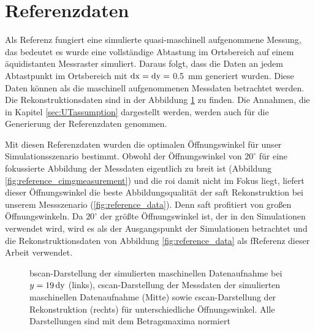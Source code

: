 \section{Referenzdaten} \label{sec:referece_data}
Als Referenz fungiert eine simulierte quasi-maschinell aufgenommene Messung, das bedeutet es wurde eine vollständige Abtastung im Ortsbereich auf einem äquidistanten Messraster simuliert. Daraus folgt, dass die Daten an jedem Abtastpunkt im Ortsbereich mit $\operatorname{dx} = \operatorname{dy} = $ \SI{0.5}{\milli \metre} generiert wurden. Diese Daten können als die maschinell aufgenommenen Messdaten betrachtet werden. Die Rekonstruktionsdaten sind in der Abbildung \ref{fig:grid_cimgs} zu finden. Die Annahmen, die in Kapitel \ref{sec:UTassumption} dargestellt werden, werden auch für die Generierung der Referenzdaten genommen. \par
Mit diesen Referenzdaten wurden die optimalen Öffnungswinkel für unser Simulationsszenario bestimmt. Obwohl der Öffnungswinkel von $20^{\circ}$ 
für eine fokussierte Abbildung der Messdaten eigentlich zu breit ist (Abbildung \ref{fig:reference_cimgmeasurement}) und die \acrshort{roi} damit nicht im Fokus liegt, liefert dieser Öffnungswinkel die beste Abbildungsqualität der \acrshort{saft} Rekonstruktion bei unserem Messszenario (\ref{fig:reference_data}). Denn \acrshort{saft} profitiert von großen Öffnungswinkeln. Da $20^{\circ}$ der größte Öffnungswinkel ist, der in den Simulationen verwendet wird, wird es als der Ausgangspunkt der Simulationen betrachtet und die Rekonstruktionsdaten von Abbildung \ref{fig:reference_data} als fReferenz dieser Arbeit verwendet. 

\begin{figure}[h!]
\begin{center}

\caption[Referenzdaten]{\gls{bscan}-Darstellung der simulierten maschinellen Datenaufnahme bei $y = 19 \operatorname{dy}$ (links),  \gls{cscan}-Darstellung der Messdaten der simulierten maschinellen Datenaufnahme (Mitte) sowie \gls{cscan}-Darstellung der Rekonstruktion (rechts) für unterschiedliche Öffnungswinkel. Alle Darstellungen sind mit dem Betragsmaxima normiert}
\label{fig:grid_cimgs}
\end{center}
\end{figure}
